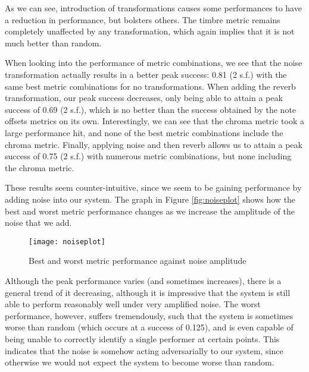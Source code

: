 \documentclass[oneside, class=book, 12pt, crop=false]{standalone}
\begin{document}

As we can see, introduction of transformations causes some performances to have a reduction in performance, but bolsters others. The timbre metric remains completely unaffected by any transformation, which again implies that it is not much better than random.

When looking into the performance of metric combinations, we see that the noise transformation actually results in a better peak success: 0.81 (2 s.f.) with the same best metric combinations for no transformations. When adding the reverb transformation, our peak success decreases, only being able to attain a peak success of 0.69 (2 s.f.), which is no better than the success obtained by the note offsets metrics on its own. Interestingly, we can see that the chroma metric took a large performance hit, and none of the best metric combinations include the chroma metric. Finally, applying noise and then reverb allows us to attain a peak success of 0.75 (2 s.f.) with numerous metric combinations, but none including the chroma metric.

These results seem counter-intuitive, since we seem to be gaining performance by adding noise into our system. The graph in Figure \ref{fig:noiseplot} shows how the best and worst metric performance changes as we increase the amplitude of the noise that we add.

\begin{figure}[h]
    \centering
    \texttt{[image: noiseplot]}
    \caption{Best and worst metric performance against noise amplitude}
    \label{fig:noiseplot2}
\end{figure}

Although the peak performance varies (and sometimes increases), there is a general trend of it decreasing, although it is impressive that the system is still able to perform reasonably well under very amplified noise. The worst performance, however, suffers tremendously, such that the system is sometimes worse than random (which occurs at a success of 0.125), and is even capable of being unable to correctly identify a single performer at certain points. This indicates that the noise is somehow acting adversarially to our system, since otherwise we would not expect the system to become worse than random.









\ifstandalone
  \printbibliography
\fi
    
\end{document}
